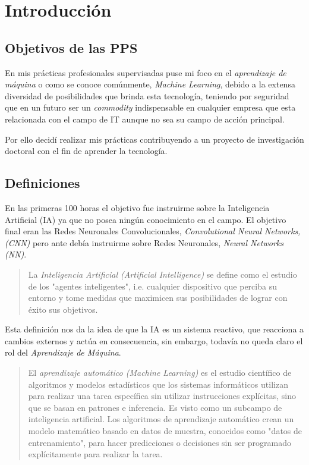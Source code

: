 \documentclass[14.5pt,a4paper]{article}
\begin{document}
\tableofcontents

\clearpage

\section{Introducción}

\subsection{Objetivos de las PPS}
En mis prácticas profesionales supervisadas puse mi foco en el \textit{aprendizaje de máquina} o como se conoce comúnmente, \textit{Machine Learning}, debido a la extensa diversidad de posibilidades que brinda esta tecnología, teniendo por seguridad que en un futuro ser un \textit{commodity} indispensable en cualquier empresa que esta relacionada con el campo de IT aunque no sea su campo de acción principal. 

Por ello decidí realizar mis prácticas contribuyendo a un proyecto de investigación doctoral con el fin de aprender la tecnología.

\subsection{Definiciones}
En las primeras 100 horas el objetivo fue instruirme sobre la Inteligencia Artificial (IA) ya que no posea ningún conocimiento en el campo.
El objetivo final eran las Redes Neuronales Convolucionales, \textit{Convolutional Neural Networks, (CNN)} pero ante debía instruirme sobre Redes Neuronales, \textit{Neural Networks (NN)}.

\begin{quote}
  La \textit{Inteligencia Artificial (Artificial Intelligence)} se define como el estudio de los "agentes inteligentes", i.e. cualquier dispositivo que perciba su entorno y tome medidas que maximicen sus posibilidades de lograr con éxito sus objetivos.
  
  \hfill \citet{poole1998}
\end{quote}

Esta definición nos da la idea de que la IA es un sistema reactivo, que reacciona a cambios externos y actúa en consecuencia, sin embargo, todavía no queda claro el rol del \textit{Aprendizaje de Máquina}.

\begin{quote}
  El \textit{aprendizaje automático (Machine Learning)} es el estudio científico de algoritmos y modelos estadísticos que los sistemas informáticos utilizan para realizar una tarea específica sin utilizar instrucciones explícitas, sino que se basan en patrones e inferencia. Es visto como un subcampo de inteligencia artificial. Los algoritmos de aprendizaje automático crean un modelo matemático basado en datos de muestra, conocidos como "datos de entrenamiento", para hacer predicciones o decisiones sin ser programado explícitamente para realizar la tarea.
  
  \hfill \citet{bishop2006pattern}
\end{quote}
\end{document}
